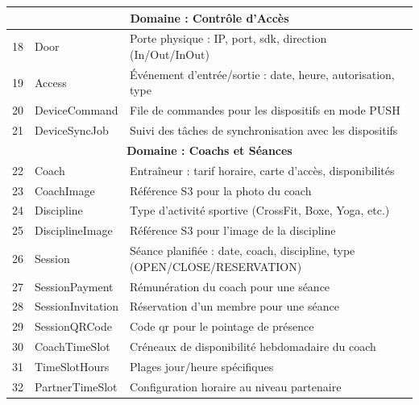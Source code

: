 \documentclass[../main.tex]{subfiles}
\begin{document}
\begin{longtable}{|c|>{\footnotesize}p{4.8cm}|p{7.5cm}|}
\multicolumn{3}{|c|}{\textbf{Domaine : Contr\^{o}le d'Acc\`{e}s}} \\
\hline
18 & Door & Porte physique : IP, port, \acrshort{sdk}, direction (In/Out/InOut) \\
\hline
19 & Access & \'{E}v\'{e}nement d'entr\'{e}e/sortie : date, heure, autorisation, type \\
\hline
20 & DeviceCommand & File de commandes pour les dispositifs en mode PUSH \\
\hline
21 & DeviceSyncJob & Suivi des t\^{a}ches de synchronisation avec les dispositifs \\
\hline

\multicolumn{3}{|c|}{\textbf{Domaine : Coachs et S\'{e}ances}} \\
\hline
22 & Coach & Entra\^{i}neur : tarif horaire, carte d'acc\`{e}s, disponibilit\'{e}s \\
\hline
23 & CoachImage & R\'{e}f\'{e}rence S3 pour la photo du coach \\
\hline
24 & Discipline & Type d'activit\'{e} sportive (CrossFit, Boxe, Yoga, etc.) \\
\hline
25 & DisciplineImage & R\'{e}f\'{e}rence S3 pour l'image de la discipline \\
\hline
26 & Session & S\'{e}ance planifi\'{e}e : date, coach, discipline, type (OPEN/CLOSE/RESERVATION) \\
\hline
27 & SessionPayment & R\'{e}mun\'{e}ration du coach pour une s\'{e}ance \\
\hline
28 & SessionInvitation & R\'{e}servation d'un membre pour une s\'{e}ance \\
\hline
29 & SessionQRCode & Code \acrshort{qr} pour le pointage de pr\'{e}sence \\
\hline
30 & CoachTimeSlot & Cr\'{e}neaux de disponibilit\'{e} hebdomadaire du coach \\
\hline
31 & TimeSlotHours & Plages jour/heure sp\'{e}cifiques \\
\hline
32 & PartnerTimeSlot & Configuration horaire au niveau partenaire \\
\hline


\end{longtable}
\end{document}
